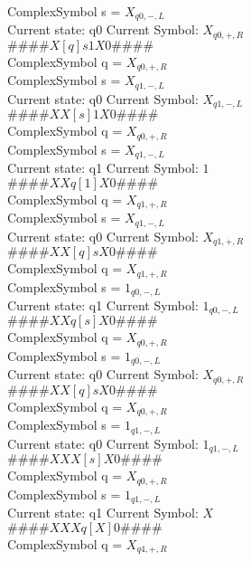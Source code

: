 \documentclass[10pt, a4paper]{article}
\begin{document}
ComplexSymbol s = $X_{q0,-,L}$ \\ 
 \medskip
Current state: q0	 Current Symbol: 	 $X_{q0,+,R}$\\
$\# \#\# \# X [ q ] s 1 X 0 \# \# \# \# $ \\
ComplexSymbol q = $X_{q0,+,R}$ \\
ComplexSymbol s = $X_{q1,-,L}$ \\ 
 \medskip
Current state: q0	 Current Symbol: 	 $X_{q1,-,L}$\\
$\# \#\# \# X X [ s ] 1 X 0 \# \# \# \# $ \\
ComplexSymbol q = $X_{q0,+,R}$ \\
ComplexSymbol s = $X_{q1,-,L}$ \\ 
 \medskip
Current state: q1	 Current Symbol: 	 $1$\\
$\# \#\# \# X X q [ 1 ] X 0 \# \# \# \# $ \\
ComplexSymbol q = $X_{q1,+,R}$ \\
ComplexSymbol s = $X_{q1,-,L}$ \\ 
 \medskip
Current state: q0	 Current Symbol: 	 $X_{q1,+,R}$\\
$\# \#\# \# X X [ q ] s X 0 \# \# \# \# $ \\
ComplexSymbol q = $X_{q1,+,R}$ \\
ComplexSymbol s = $1_{q0,-,L}$ \\ 
 \medskip
Current state: q1	 Current Symbol: 	 $1_{q0,-,L}$\\
$\# \#\# \# X X q [ s ] X 0 \# \# \# \# $ \\
ComplexSymbol q = $X_{q0,+,R}$ \\
ComplexSymbol s = $1_{q0,-,L}$ \\ 
 \medskip
Current state: q0	 Current Symbol: 	 $X_{q0,+,R}$\\
$\# \#\# \# X X [ q ] s X 0 \# \# \# \# $ \\
ComplexSymbol q = $X_{q0,+,R}$ \\
ComplexSymbol s = $1_{q1,-,L}$ \\ 
 \medskip
Current state: q0	 Current Symbol: 	 $1_{q1,-,L}$\\
$\# \#\# \# X X X [ s ] X 0 \# \# \# \# $ \\
ComplexSymbol q = $X_{q0,+,R}$ \\
ComplexSymbol s = $1_{q1,-,L}$ \\ 
 \medskip
Current state: q1	 Current Symbol: 	 $X$\\
$\# \#\# \# X X X q [ X ] 0 \# \# \# \# $ \\
ComplexSymbol q = $X_{q4,+,R}$ \\
\end{document}
